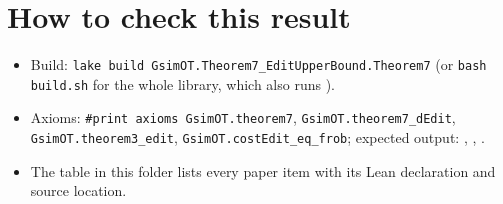\section{How to check this result}
\begin{itemize}
\item Build: \texttt{lake build GsimOT.Theorem7\_EditUpperBound.Theorem7} (or \texttt{bash build.sh} for the whole
  library, which also runs ).
\item Axioms: \texttt{\#print axioms GsimOT.theorem7}, \texttt{GsimOT.theorem7\_dEdit},
  \texttt{GsimOT.theorem3\_edit}, \texttt{GsimOT.costEdit\_eq\_frob}; expected output: ,
  , .
\item The table  in this folder lists every paper item with its Lean
  declaration and source location.
\end{itemize}

